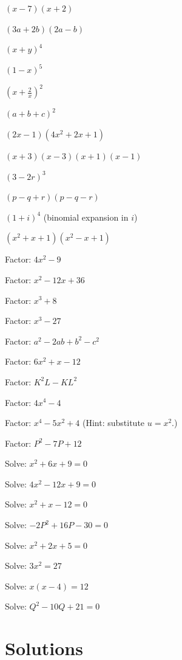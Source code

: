 \begin{problems}
  \item $(x-7)(x+2)$
  \item $(3a+2b)(2a-b)$
  \item $(x+y)^{4}$
  \item $(1-x)^{5}$
  \item $\displaystyle\left(x+\frac{2}{x}\right)^{2}$
  \item $(a+b+c)^{2}$
  \item $(2x-1)(4x^{2}+2x+1)$
  \item $(x+3)(x-3)(x+1)(x-1)$
  \item $(3-2r)^{3}$
  \item $(p-q+r)(p-q-r)$
  \item $(1+i)^{4}$ (binomial expansion in $i$)
  \item $(x^{2}+x+1)(x^{2}-x+1)$
  \item Factor: $4x^{2}-9$
  \item Factor: $x^{2}-12x+36$
  \item Factor: $x^{3}+8$
  \item Factor: $x^{3}-27$
  \item Factor: $a^{2}-2ab+b^{2}-c^{2}$
  \item Factor: $6x^{2}+x-12$
  \item Factor: $K^{2}L-KL^{2}$
  \item Factor: $4x^{4}-4$
  \item Factor: $x^{4}-5x^{2}+4$ (Hint: substitute $u=x^{2}$.)
  \item Factor: $P^{2}-7P+12$
  \item Solve: $x^{2}+6x+9=0$
  \item Solve: $4x^{2}-12x+9=0$
  \item Solve: $x^{2}+x-12=0$
  \item Solve: $-2P^{2}+16P-30=0$
  \item Solve: $x^{2}+2x+5=0$
  \item Solve: $3x^{2}=27$
  \item Solve: $x(x-4)=12$
  \item Solve: $Q^{2}-10Q+21=0$
\end{problems}

\section{Solutions}

